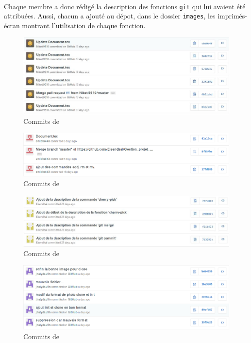 \documentclass[11pt,canadien]{article}
\begin{document}
\paragraph{}Chaque membre a donc rédigé la description des fonctions \texttt{git} qui lui avaient été attribuées. Aussi, chacun a ajouté au dépot, dans le dossier \texttt{images}, les imprimés-écran montrant l'utilisation de chaque fonction.

\begin{figure}
	\centering
	\includegraphics[width=\textwidth]{images/commit_antoine.JPG}
	\caption{Commits de \antoine}
\end{figure}

\begin{figure}
	\centering
	\includegraphics[width=\textwidth]{images/commit_estelle.png}
	\caption{Commits de \estelle}
\end{figure}

\begin{figure}
	\centering
	\includegraphics[width=\textwidth]{images/commit_joffrey.JPG}
	\caption{Commits de \joffrey}
\end{figure}

\begin{figure}
	\centering
	\includegraphics[width=\textwidth]{images/commit_julien.png}
	\caption{Commits de \julien}
\end{figure}
\end{document}
